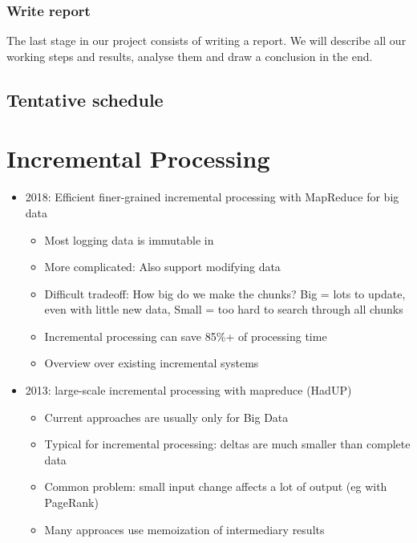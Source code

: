 \documentclass{seal_article}
\begin{document}
\subsubsection{Write report}
The last stage in our project consists of writing a report. We will describe all our working steps and results, analyse them and draw a conclusion in the end.

\subsection{Tentative schedule}

\section{Incremental Processing}
\begin{itemize}
\item 2018: Efficient finer-grained incremental processing with MapReduce for big data
\begin{itemize}
\item Most logging data is immutable in
\item More complicated: Also support modifying data
\item Difficult tradeoff: How big do we make the chunks? Big = lots to update, even with little new data, Small = too hard to search through all chunks
\item Incremental processing can save 85\%+ of processing time
\item Overview over existing incremental systems
\end{itemize}
\item 2013: large-scale incremental processing with mapreduce (HadUP)
\begin{itemize}
\item Current approaches are usually only for Big Data
\item Typical for incremental processing: deltas are much smaller than complete data
\item Common problem: small input change affects a lot of output (eg with PageRank)
\item Many approaces use memoization of intermediary results
\end{itemize}
\end{itemize}




\end{document}

